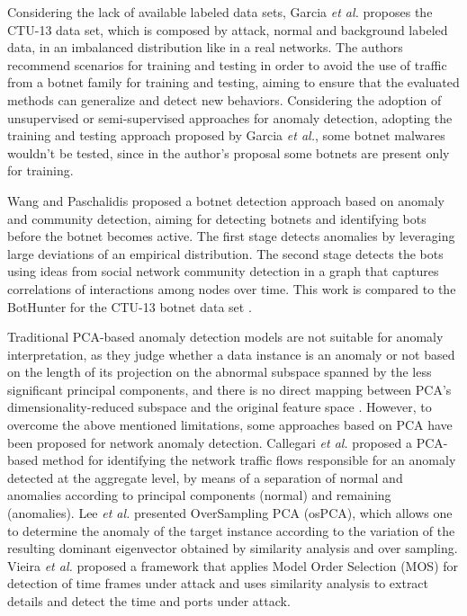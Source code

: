Considering the lack of available labeled data sets, Garcia \emph{et al.} \cite{garcia2014empirical} proposes the CTU-13 data set, which is composed by attack, normal and background labeled data, in an imbalanced distribution like in a real networks. The authors recommend scenarios for training and testing in order to avoid the use of traffic from a botnet family for training and testing, aiming to ensure that the evaluated methods can generalize and detect new behaviors. Considering the adoption of unsupervised or semi-supervised approaches for anomaly detection, adopting the training and testing approach proposed by Garcia \emph{et al.}, some botnet malwares wouldn't be tested, since in the author's proposal some botnets are present only for training.

Wang and Paschalidis \cite{wang2017botnet} proposed a botnet detection approach based on anomaly and community detection, aiming for detecting botnets and identifying bots before the botnet becomes active. The first stage detects anomalies by leveraging large deviations of an empirical distribution. The second stage detects the bots using ideas from social network community detection in a graph that captures correlations of interactions among nodes over time. This work is compared to the BotHunter \cite{gu2007bothunter} for the CTU-13 botnet data set \cite{garcia2014empirical}.

Traditional PCA-based anomaly detection models are not suitable for anomaly interpretation, as they judge whether a data instance is an anomaly or not based on the length of its projection on the abnormal subspace spanned by the less significant principal components, and there is no direct mapping between PCA’s dimensionality-reduced subspace and the original feature space \cite{ringberg2007sensitivity}. However, to overcome the above mentioned limitations, some approaches based on PCA have been proposed for network anomaly detection. Callegari \emph{et al.} \cite{callegari2011novel} proposed a PCA-based method for identifying the network traffic flows responsible for an anomaly detected at the aggregate level, by means of a separation of normal and anomalies according to principal components (normal) and remaining (anomalies). Lee \emph{et al.} \cite{Lee2013} presented OverSampling PCA (osPCA), which allows one to determine the anomaly of the target instance according to the variation of the resulting dominant eigenvector obtained by similarity analysis and over sampling. Vieira \emph{et al.} \cite{vieira2017model} proposed a framework that applies Model Order Selection (MOS) for detection of time frames under attack and uses similarity analysis to extract details and detect the time and ports under attack.


